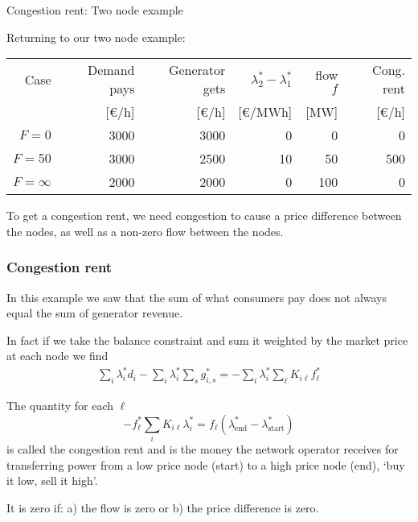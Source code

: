\documentclass[10pt,dvipsnames]{beamer}
\newcommand{\ra}[1]{\renewcommand{\arraystretch}{#1}}
\def\l{\lambda}
\begin{document}
\begin{frame}{Congestion rent: Two node example}

  Returning to our two node example:
  \ra{1.1}
  \begin{table}[!t]
    \begin{tabular}{rrrrrr}
      \toprule
      Case & Demand pays & Generator gets & $\l_2^* - \l_1^*$ & flow $f$ & Cong. rent \\
       & [\euro/h] & [\euro/h] & [\euro/MWh] & [MW] & [\euro/h] \\
      \midrule
      $F = 0$ & 3000 & 3000 & 0 & 0 & 0 \\
      $F = 50$ & 3000 & 2500 & 10 & 50 & 500 \\
      $F = \infty$ & 2000 & 2000 & 0 & 100 & 0 \\
      \bottomrule
    \end{tabular}
  \end{table}

To get a congestion rent, we need congestion to cause a price
difference between the nodes, as well as a non-zero flow between the
nodes.

\end{frame}



\begin{frame}[fragile]
  \frametitle{Congestion rent}

  In this example we saw that the sum of what consumers pay does not always equal the sum of generator revenue.

  In fact if we take the balance constraint and sum it weighted by the market price at each node we find
  \begin{align*}
    \sum_i \l_i^* d_i -   \sum_i \l_i^* \sum_{s} g^*_{i,s} = -\sum_i \l_i^* \sum_\ell K_{i\ell}f^*_\ell
  \end{align*}

  The quantity for each $\ell$
  \begin{equation*}
    -f_\ell^*\sum_i K_{i\ell} \l_i^* = f_\ell (\l_{\textrm{end}}^* - \l_{\textrm{start}}^*)
  \end{equation*}
  is called the \alert{congestion rent} and is the money the network
  operator receives for transferring power from a low price node (start)
  to a high price node (end), `buy it low, sell it high'.

  It is zero if: a) the flow is zero or b) the price difference is zero.

\end{frame}
\end{document}
